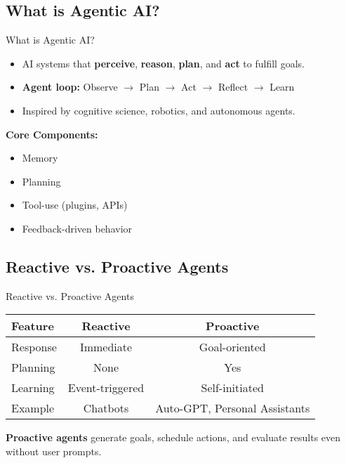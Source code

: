 \subsection{What is Agentic AI?}
\begin{frame}{What is Agentic AI?}
    \begin{itemize}
        \item AI systems that \textbf{perceive}, \textbf{reason}, \textbf{plan}, and \textbf{act} to fulfill goals.
        \item \textbf{Agent loop:} Observe $\rightarrow$ Plan $\rightarrow$ Act $\rightarrow$ Reflect $\rightarrow$ Learn
        \item Inspired by cognitive science, robotics, and autonomous agents.
    \end{itemize}
    \vspace{1em}
    \textbf{Core Components:}
    \begin{itemize}
        \item Memory
        \item Planning
        \item Tool-use (plugins, APIs)
        \item Feedback-driven behavior
    \end{itemize}
\end{frame}

\subsection{Reactive vs. Proactive Agents}
\begin{frame}{Reactive vs. Proactive Agents}
    \begin{table}[]
        \centering
        \renewcommand{\arraystretch}{1.8}
        \begin{tabular}{lcc}
            \hline
            \textbf{Feature} & \textbf{Reactive} & \textbf{Proactive} \\
            \hline
            Response & Immediate & Goal-oriented \\
            Planning & None & Yes \\
            Learning & Event-triggered & Self-initiated \\
            Example & Chatbots & Auto-GPT, Personal Assistants \\
            \hline
        \end{tabular}
    \end{table}
    \vspace{1em}
    
    \textbf{Proactive agents} generate goals, schedule actions, and evaluate results even without user prompts.
\end{frame}

